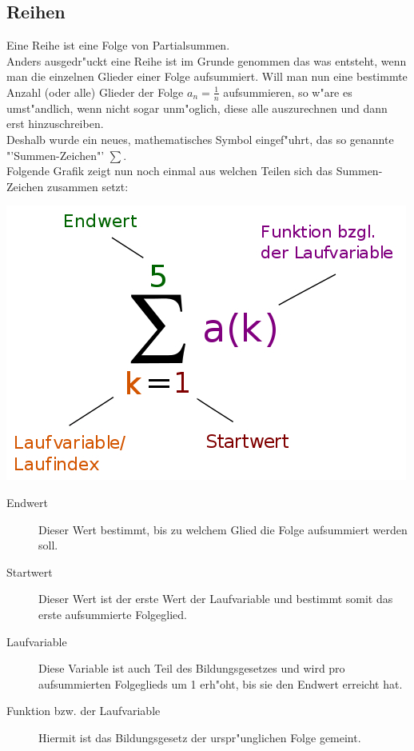 \subsection{Reihen}
Eine Reihe ist eine Folge von Partialsummen.\\
Anders ausgedr"uckt eine Reihe ist im Grunde genommen das was entsteht, wenn man die einzelnen Glieder einer Folge aufsummiert. Will man nun eine bestimmte Anzahl (oder alle) Glieder der Folge $a_n = \frac{1}{n}$ aufsummieren, so w"are es umst"andlich, wenn nicht sogar unm"oglich, diese alle auszurechnen und dann erst hinzuschreiben.\\
Deshalb wurde ein neues, mathematisches Symbol eingef"uhrt, das so genannte "'Summen-Zeichen"' $\sum$.
\vspace{1 cm}\\
Folgende Grafik zeigt nun noch einmal aus welchen Teilen sich das Summen-Zeichen zusammen setzt:
\vspace{0.5 cm}\\
\begin{minipage}{7 cm}
\includegraphics[width = 7 cm]{pictures/summe}
\begin{description}
\item[Endwert] Dieser Wert bestimmt, bis zu welchem Glied die Folge aufsummiert werden soll.
\end{description}
\end{minipage}
\begin{minipage}{7 cm}
\begin{description}
\item[Startwert] Dieser Wert ist der erste Wert der Laufvariable und bestimmt somit das erste aufsummierte Folgeglied.
\item[Laufvariable] Diese Variable ist auch Teil des Bildungsgesetzes und wird pro aufsummierten Folgeglieds um 1 erh"oht, bis sie den Endwert erreicht hat.
\item[Funktion bzw. der Laufvariable] Hiermit ist das Bildungsgesetz der urspr"unglichen Folge gemeint.
\end{description}
\end{minipage}

